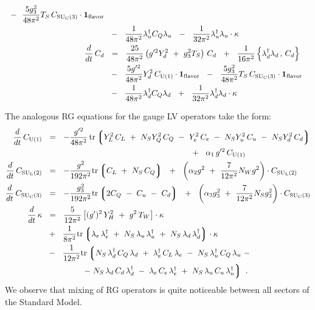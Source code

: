 \documentclass[12pt,preprintnumbers,nofootinbib]{revtex4}
\newcommand{\suc}{{{\rm SU}_{\rm C}(3)}}
\newcommand{\sul}{{{\rm SU}_{\rm L}(2)}}
\newcommand{\ue}{{{\rm U}(1)}}
\newcommand{\uflavor}{\mathbf{1}_{\rm flavor}}
\newcommand{\lgr}{\left\lgroup}
\newcommand{\rgr}{\right\rgroup}
\begin{document}
\begin{align}
	~~-~~
	\frac{5 g_3^2}{48\pi^2} T_S\, C_\suc \cdot \uflavor 
	\\
\notag
	&
	~~-~~
	\frac{1}{48\pi^2}
	\lambda_u^\dag C_Q \lambda_u 
	~~-~~
	\frac{1}{32\pi^2}
	\lambda_u^\dag \lambda_u \cdot
	\kappa
	\\
\notag
	\frac{d}{dt}\, 
	C_d
	&
	~~=~~
	\frac{25}{48\pi^2} 
	\left( g'^2 Y_d^2 ~+~ g_3^2 T_S 
	\right)\, C_d
	~~+~~
	\frac{1}{16\pi^2} 
	\left\{ \lambda_d^\dag \lambda_d \,,\, C_d 
	\right\}
	\\
\notag
	&
	~~-~~
	\frac{5 g'^2}{48\pi^2} Y_d^2 \, C_\ue \cdot \uflavor
	~~-~~
	\frac{5 g_3^2}{48\pi^2} T_S \, C_\suc \cdot \uflavor
	\\
\notag
	&
	~~-~~
	\frac{1}{48\pi^2} \lambda_d^\dag C_Q \lambda_d 
	~~+~~
	\frac{1}{32\pi^2} \lambda_d^\dag \lambda_d \cdot
	\kappa
\end{align}

	The analogous RG equations for the gauge LV operators take the form:
\begin{align}
\label{RG_above_gauge}
\notag
	\frac{d}{dt}\, 
	C_\ue 
	&
	~~=~~
	- \frac{g'^2}{48\pi^2}\,
	{\rm tr} 
	\lgr
		Y_L^2\, C_L ~+~ N_S Y_Q^2\, C_Q ~-~
		Y_e^2\, C_e ~-~ 
		N_S Y_u^2\, C_u ~-~ N_S Y_d^2\, C_d
	\rgr
	\\
\notag
	&
	\qquad\qquad\qquad\qquad\qquad\qquad\qquad\qquad\qquad
	~~+~~
	\alpha_1 \, g'^2 \, C_\ue
	\\
\notag
	\frac{d}{dt}\, 
	C_\sul 
	&
	~~=~~
	- \frac{g^2}{192\pi^2} {\rm tr} \lgr C_L ~+~ N_S \, C_Q \rgr
	~~+~~
	\left(
		\alpha_2 g^2 ~+~
		\frac{7}{12\pi^2}N_W g^2 
	\right) \cdot
	C_\sul
	\\
	\frac{d}{dt}\, 
	C_\suc
	&
	~~=~~
	- \frac{g_3^2}{192\pi^2} 
	{\rm tr} \lgr
		2 C_Q ~-~ C_u ~-~ C_d 
		\rgr
	~~+~~
	\left(
		\alpha_3 g_3^2 ~+~
		\frac{7}{12\pi^2} N_S g_3^2
	\right) \cdot
	C_\suc
	\\
\notag
	\frac{d}{dt}\, 
	\kappa
	&
	~~=~~
	\frac{5}{12\pi^2} 
	\left[
		(g')^2\, Y_H^2 ~+~ g^2\, T_W
	\right] \cdot \kappa
	\\
\notag
	&
	~~+~~
	\frac{1}{8\pi^2}
	{\rm tr}
	\lgr
		\lambda_e\, \lambda_e^\dag
		~+~
		N_S\, \lambda_u\, \lambda_u^\dag
		~+~
		N_S\, \lambda_d\, \lambda_d^\dag
	\rgr
	\cdot \kappa
	\\
\notag
	&
	~~-~~
	\frac{1}{12\pi^2}
	{\rm tr} 
	\lgr
		N_S\, \lambda_d^\dag\, C_Q\, \lambda_d 
		~+~
		\lambda_e^\dag\, C_L\, \lambda_e
		~-~
		N_S\, \lambda_u^\dag\, C_Q\, \lambda_u
		~-
	\right.
	\\
\notag
	&
	\qquad\qquad\quad
	\left.
		-~
		N_S\, \lambda_d\, C_d\, \lambda_d^\dag
		~-~
		\lambda_e\, C_e\, \lambda_e^\dag
		~+~
		N_S\, \lambda_u\, C_u\, \lambda_u^\dag
	\rgr
	~.
\end{align}
	We observe that mixing of RG operators is quite noticeable between all sectors
	of the Standard Model.
\end{document}
